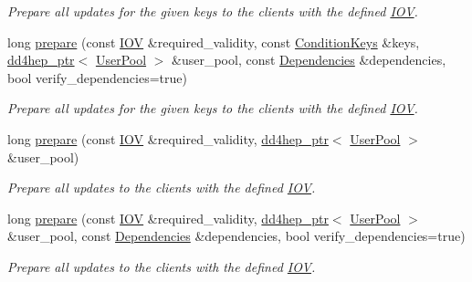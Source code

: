 \begin{DoxyCompactItemize}
\begin{DoxyCompactList}\small\item\em Prepare all updates for the given keys to the clients with the defined \hyperlink{class_d_d4hep_1_1_i_o_v}{I\+OV}. \end{DoxyCompactList}\item 
long \hyperlink{class_d_d4hep_1_1_conditions_1_1_conditions_manager_a8b8e72ff8060db98ecbd19a6a05eafa6}{prepare} (const \hyperlink{class_d_d4hep_1_1_i_o_v}{I\+OV} \&required\+\_\+validity, const \hyperlink{class_d_d4hep_1_1_conditions_1_1_conditions_manager_a8dd76f9acef2c8d3b7970e266fe7eff6}{Condition\+Keys} \&keys, \hyperlink{class_d_d4hep_1_1dd4hep__ptr}{dd4hep\+\_\+ptr}$<$ \hyperlink{class_d_d4hep_1_1_conditions_1_1_user_pool}{User\+Pool} $>$ \&user\+\_\+pool, const \hyperlink{class_d_d4hep_1_1_conditions_1_1_conditions_manager_aab778cfbe096ae8ad20a0bdbb047ad32}{Dependencies} \&dependencies, bool verify\+\_\+dependencies=true)
\begin{DoxyCompactList}\small\item\em Prepare all updates for the given keys to the clients with the defined \hyperlink{class_d_d4hep_1_1_i_o_v}{I\+OV}. \end{DoxyCompactList}\item 
long \hyperlink{class_d_d4hep_1_1_conditions_1_1_conditions_manager_a16a1aa58d0a9d61d9bed50b16705a63e}{prepare} (const \hyperlink{class_d_d4hep_1_1_i_o_v}{I\+OV} \&required\+\_\+validity, \hyperlink{class_d_d4hep_1_1dd4hep__ptr}{dd4hep\+\_\+ptr}$<$ \hyperlink{class_d_d4hep_1_1_conditions_1_1_user_pool}{User\+Pool} $>$ \&user\+\_\+pool)
\begin{DoxyCompactList}\small\item\em Prepare all updates to the clients with the defined \hyperlink{class_d_d4hep_1_1_i_o_v}{I\+OV}. \end{DoxyCompactList}\item 
long \hyperlink{class_d_d4hep_1_1_conditions_1_1_conditions_manager_afb09828cf1420ca6a9abb815ccf7d06c}{prepare} (const \hyperlink{class_d_d4hep_1_1_i_o_v}{I\+OV} \&required\+\_\+validity, \hyperlink{class_d_d4hep_1_1dd4hep__ptr}{dd4hep\+\_\+ptr}$<$ \hyperlink{class_d_d4hep_1_1_conditions_1_1_user_pool}{User\+Pool} $>$ \&user\+\_\+pool, const \hyperlink{class_d_d4hep_1_1_conditions_1_1_conditions_manager_aab778cfbe096ae8ad20a0bdbb047ad32}{Dependencies} \&dependencies, bool verify\+\_\+dependencies=true)
\begin{DoxyCompactList}\small\item\em Prepare all updates to the clients with the defined \hyperlink{class_d_d4hep_1_1_i_o_v}{I\+OV}. \end{DoxyCompactList}\item 

\end{DoxyCompactItemize}
